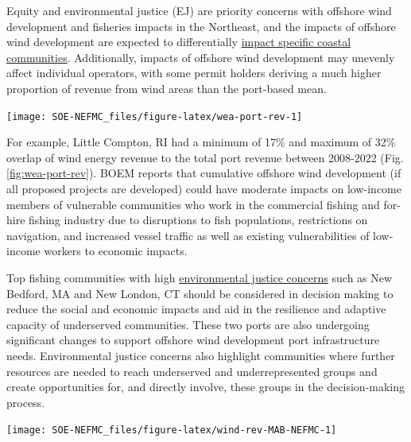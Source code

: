 \documentclass[
  10pt,
]{article}
\let\origfigure\figure
\let\endorigfigure\endfigure
\renewenvironment{figure}[1][2] {
    \expandafter\origfigure\expandafter[H]
} {
    \endorigfigure
}
\begin{document}
Equity and environmental justice (EJ) are priority concerns with offshore wind development and fisheries impacts in the Northeast, and the impacts of offshore wind development are expected to differentially \href{https://noaa-edab.github.io/catalog/community-port-landings-and-revenue-from-wind-energy-areas-weas.html}{impact specific coastal communities}. Additionally, impacts of offshore wind development may unevenly affect individual operators, with some permit holders deriving a much higher proportion of revenue from wind areas than the port-based mean.

\begin{figure}

\texttt{[image: SOE-NEFMC\_files/figure-latex/wea-port-rev-1]} \hfill{}

\caption{Percent of port fisheries revenue from Wind Energy Areas (WEA) in descending order from most to least port fisheries revenue from WEA. EJ = Environmental Justice.}\label{fig:wea-port-rev}
\end{figure}

For example, Little Compton, RI had a minimum of 17\% and maximum of 32\% overlap of wind energy revenue to the total port revenue between 2008-2022 (Fig. \ref{fig:wea-port-rev}). BOEM reports that cumulative offshore wind development (if all proposed projects are developed) could have moderate impacts on low-income members of vulnerable communities who work in the commercial fishing and for-hire fishing industry due to disruptions to fish populations, restrictions on navigation, and increased vessel traffic as well as existing vulnerabilities of low-income workers to economic impacts.

Top fishing communities with high \href{https://noaa-edab.github.io/catalog/engagement-reliance-and-environmental-justice-in-top-fishing-communities.html}{environmental justice concerns} such as New Bedford, MA and New London, CT should be considered in decision making to reduce the social and economic impacts and aid in the resilience and adaptive capacity of underserved communities. These two ports are also undergoing significant changes to support offshore wind development port infrastructure needs. Environmental justice concerns also highlight communities where further resources are needed to reach underserved and underrepresented groups and create opportunities for, and directly involve, these groups in the decision-making process.

\begin{figure}

\texttt{[image: SOE-NEFMC\_files/figure-latex/wind-rev-MAB-NEFMC-1]} \hfill{}

\caption{Percent of Mid-Atlantic port revenue with majority NEFMC landings from Wind Energy Areas (WEA) in descending order from most to least port fisheries revenue from WEA. EJ = Environmental Justice.}\label{fig:wind-rev-MAB-NEFMC}
\end{figure}
\end{document}

